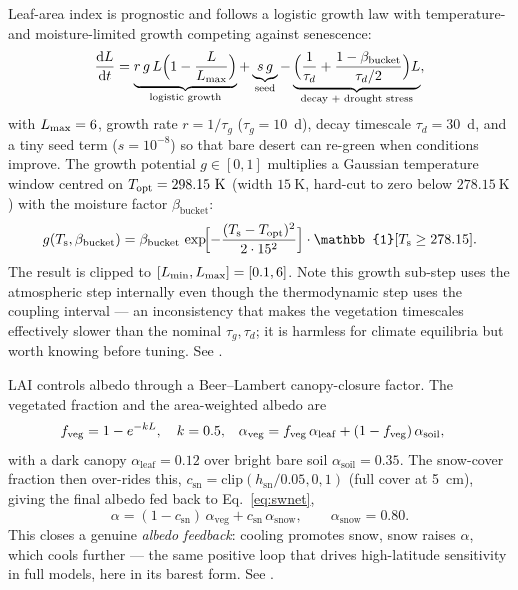 Leaf-area index is prognostic and follows a logistic growth law with
temperature- and moisture-limited growth competing against senescence:
\begin{equation}
  \frac{\mathrm{d}L}{\mathrm{d}t} = \underbrace{r\,g\,L\Bigl(1-\frac{L}{L_{\max}}\Bigr)}_{\text{logistic growth}}
            + \underbrace{s\,g}_{\text{seed}}
            - \underbrace{\Bigl(\frac{1}{\tau_d} + \frac{1-\beta_{\mathrm{bucket}}}{\tau_d/2}\Bigr)L}_{\text{decay + drought stress}},
  \label{eq:lai}
\end{equation}
with $L_{\max}=6$, growth rate $r=1/\tau_g$ ($\tau_g=10$~d), decay timescale
$\tau_d=30$~d, and a tiny seed term ($s=10^{-8}$) so that bare desert can
re-green when conditions improve. The growth potential $g\in[0,1]$ multiplies a
Gaussian temperature window centred on $T_{\mathrm{opt}}=298.15\ \mathrm{K}$ (width
$15\ \mathrm{K}$, hard-cut to zero below $278.15\ \mathrm{K}$) with the moisture
factor $\beta_{\mathrm{bucket}}$:
\begin{equation}
  g(\Tsfc,\beta_{\mathrm{bucket}}) =
  \beta_{\mathrm{bucket}}\,\exp\!\Bigl[-\frac{(\Tsfc-\Topt)^2}{2\cdot 15^2}\Bigr]
  \cdot \mathbb{1}[\Tsfc \ge 278.15].
\end{equation}
The result is clipped to $[L_{\min},L_{\max}]=[0.1,6]$. Note this growth
sub-step uses the atmospheric step  internally even though the
thermodynamic step uses the coupling interval --- an inconsistency that makes
the vegetation timescales effectively slower than the nominal $\tau_g,\tau_d$;
it is harmless for climate equilibria but worth knowing before tuning. See
.

LAI controls albedo through a Beer--Lambert canopy-closure factor. The vegetated
fraction and the area-weighted albedo are
\begin{align}
  f_{\mathrm{veg}} &= 1 - e^{-kL}, \quad k=0.5, &
  \alpha_{\mathrm{veg}} &= f_{\mathrm{veg}}\,\alpha_{\mathrm{leaf}}
                          + (1-f_{\mathrm{veg}})\,\alpha_{\mathrm{soil}},
  \label{eq:vegalbedo}
\end{align}
with a dark canopy $\alpha_{\mathrm{leaf}}=0.12$ over bright bare soil
$\alpha_{\mathrm{soil}}=0.35$. The snow-cover fraction then over-rides this,
$c_{\mathrm{sn}}=\mathrm{clip}(h_{\mathrm{sn}}/0.05,0,1)$ (full cover at 5~cm),
giving the final albedo fed back to Eq.~\eqref{eq:swnet},
\begin{equation}
  \alpha = (1-c_{\mathrm{sn}})\,\alpha_{\mathrm{veg}} + c_{\mathrm{sn}}\,\alpha_{\mathrm{snow}},
  \qquad \alpha_{\mathrm{snow}}=0.80.
  \label{eq:albedo}
\end{equation}
This closes a genuine \emph{albedo feedback}: cooling promotes snow, snow raises
$\alpha$, which cools further --- the same positive loop that drives high-latitude
sensitivity in full models, here in its barest form. See
.

